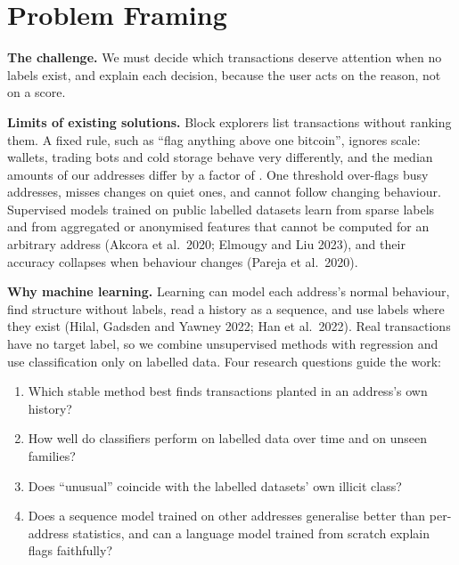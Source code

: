 \section{Problem Framing}
\label{sec:problem}

\textbf{The challenge.} We must decide which transactions deserve attention when no labels exist, and explain
each decision, because the user acts on the reason, not on a score.

\textbf{Limits of existing solutions.} Block explorers list transactions without ranking them. A fixed rule, such
as ``flag anything above one bitcoin'', ignores scale: wallets, trading bots and cold storage behave very
differently, and the median amounts of our addresses differ by a factor of . One threshold
over-flags busy addresses, misses changes on quiet ones, and cannot follow changing behaviour. Supervised models
trained on public labelled datasets learn from sparse labels and from aggregated or anonymised features that cannot
be computed for an arbitrary address (Akcora et al.\ 2020; Elmougy and Liu 2023), and their accuracy collapses when
behaviour changes (Pareja et al.\ 2020).

\textbf{Why machine learning.} Learning can model each address's normal behaviour, find structure without
labels, read a history as a sequence, and use labels where they exist (Hilal, Gadsden and Yawney 2022; Han et
al.\ 2022). Real transactions have no target label, so we combine unsupervised methods with regression and use
classification only on labelled data. Four research questions guide the work:
\begin{enumerate}[label=RQ\arabic*]
  \item Which stable method best finds transactions planted in an address's own history?
  \item How well do classifiers perform on labelled data over time and on unseen families?
  \item Does ``unusual'' coincide with the labelled datasets' own illicit class?
  \item Does a sequence model trained on other addresses generalise better than per-address statistics, and can a
    language model trained from scratch explain flags faithfully?
\end{enumerate}
